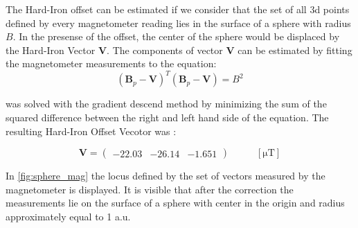 The Hard-Iron offset can be estimated if we consider that the set of all 3d points defined by every magnetometer reading lies in the surface of a sphere with radius \ensuremath{B}. In the presense of the offset, the center of the sphere would be displaced by the Hard-Iron Vector \ensuremath{\boldsymbol{V}}. The components of vector \ensuremath{\boldsymbol{V}} can be estimated by fitting the magnetometer measurements to the equation:
\begin{equation}
    \left(\boldsymbol{B}_{p}-\boldsymbol{V}\right)^{T}\left(\boldsymbol{B}_{p}-\boldsymbol{V}\right)=B^{2}
    \label{eq:magOptim}
\end{equation}

 was solved with the gradient descend method by minimizing the  sum of the squared difference between the right and left hand side of the equation. The resulting Hard-Iron Offset Vecotor was :

\begin{equation}
    \boldsymbol{V}=\left(\begin{array}{ccc} -22.03 & -26.14 & -1.651 \end{array}\right)\;\;\;\;\;\;\;\;\;\;[\si{\micro\tesla}]
\end{equation}

In \cref{fig:sphere_mag} the locus defined by the set of vectors measured by the magnetometer is displayed. It is visible that after the correction the measurements lie on the surface of a sphere with center in the origin and radius approximately equal to 1 a.u.


